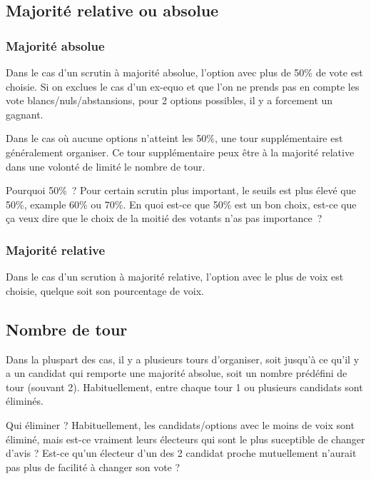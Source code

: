 \documentclass[../report]{subfiles}
\begin{document}
  \subsection{Majorité relative ou absolue}
  \subsubsection{Majorité absolue}
  Dans le cas d'un scrutin à majorité absolue, l'option avec plus de 50\% de vote est choisie.
  Si on exclues le cas d'un ex-equo et que l'on ne prends pas en compte les vote 
  blancs/nuls/abstansions, pour 2 options possibles, il y a forcement un gagnant.
  
  Dans le cas où aucune options n'atteint les 50\%, une tour supplémentaire est généralement
  organiser.
  Ce tour supplémentaire peux être à la majorité relative dans une volonté de limité le nombre
  de tour.
  
  \begin{nota}{Pourquoi 50\%~?}
    Pour certain scrutin plus important, le seuils est plus élevé que 50\%, example 60\% ou 70\%. 
    En quoi est-ce que 50\% est un bon choix, est-ce que ça veux dire que le choix de la moitié
    des votants n'as pas importance~? 
  \end{nota}
  
  \subsubsection{Majorité relative}
  Dans le cas d'un scrution à majorité relative, l'option avec le plus de voix est choisie, 
  quelque soit son pourcentage de voix.
  
  \subsection{Nombre de tour}
  
  Dans la pluspart des cas, il y a plusieurs tours d'organiser, soit jusqu'à ce qu'il y a 
  un candidat qui remporte une majorité absolue, soit un nombre prédéfini de tour (souvant 2).
  Habituellement, entre chaque tour 1 ou plusieurs candidats sont éliminés.
  
  \begin{nota}{Qui éliminer ?}
    Habituellement, les candidats/options avec le moins de voix sont éliminé, mais
    est-ce vraiment leurs électeurs qui sont le plus suceptible de changer d'avis ?
    Est-ce qu'un électeur d'un des 2 candidat proche mutuellement n'aurait pas plus
    de facilité à changer son vote ?
  \end{nota}
\end{document}
